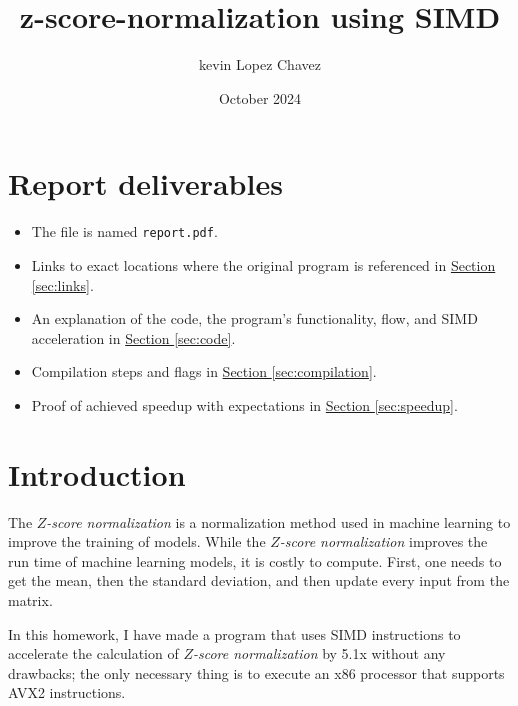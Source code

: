 \documentclass{article}
\title{z-score-normalization using SIMD}
\author{kevin Lopez Chavez}
\date{October 2024}
\newcommand{\zonenorm}{\textit{$Z$-score normalization}}
\begin{document}
\maketitle

\section{Report deliverables}
\begin{itemize}
    \item The file is named \texttt{report.pdf}.
    \item Links to exact locations where the original program is referenced in \hyperref[sec:links]{Section \ref*{sec:links}}.
    \item An explanation of the code, the program's functionality, flow, and SIMD acceleration in \hyperref[sec:code]{Section \ref*{sec:code}}.
    \item Compilation steps and flags in \hyperref[sec:compilation]{Section \ref*{sec:compilation}}.
    \item Proof of achieved speedup with expectations in \hyperref[sec:speedup]{Section \ref*{sec:speedup}}.
\end{itemize}



\section{Introduction}
The \zonenorm{} is a normalization method used in machine learning to improve the training of models.
While the \zonenorm{} improves the run time of machine learning models, it is costly to compute.
First, one needs to get the mean, then the standard deviation, and then update every input from the matrix.

In this homework, I have made a program that uses SIMD instructions to accelerate the calculation of \zonenorm{} by 5.1x without any drawbacks; the only necessary thing is to execute an x86 processor that supports AVX2 instructions.

\end{document}
